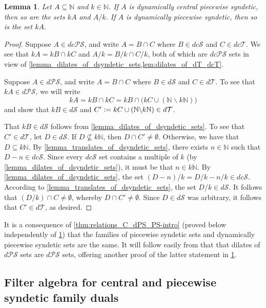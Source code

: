 \documentclass[letter,11pt]{article}
\theoremstyle{plain}
\newtheorem{lemma}[theorem]{Lemma}
\theoremstyle{definition}
\theoremstyle{plain}
\theoremstyle{plain}
\numberwithin{equation}{section}
\newcommand{\N}{\mathbb{N}}
\newcommand{\defeq}{\vcentcolon=}
\renewcommand{\setminus}{\backslash}
\newcommand{\dsyndetic}{d\mathcal{S}}
\newcommand{\dthick}{d\mathcal{T}}
\newcommand{\dcsyndetic}{dc\mathcal{S}}
\newcommand{\dcthick}{dc\mathcal{T}}
\newcommand{\dPS}{d\mathcal{PS}}
\newcommand{\dcPS}{dc\mathcal{PS}}
\begin{document}
\begin{lemma}
\label{lemma_dilates_of_dps_sets}
    Let $A \subseteq \N$ and $k \in \N$. If $A$ is dynamically central piecewise syndetic, then so are the sets $kA$ and $A/k$. If $A$ is dynamically piecewise syndetic, then so is the set $kA$.
\end{lemma}

\begin{proof}
    Suppose $A \in \dcPS$, and write $A = B \cap C$ where $B \in \dcsyndetic$ and $C \in \dcthick$. We see that $kA = kB \cap kC$ and $A/k = B/k \cap C/k$, both of which are $\dcPS$ sets in view of  \cref{lemma_dilates_of_dsyndetic_sets,lem:dilates_of_dT_dcT}.

    Suppose $A \in \dPS$, and write $A = B \cap C$ where $B \in \dsyndetic$ and $C \in \dthick$.  To see that $kA \in \dPS$, we will write
    \[kA = kB \cap kC = kB \cap \big( kC \cup ( \N \setminus k \N ) \big)\]
    and show that $kB \in \dsyndetic$ and $C' \defeq kC \cup ( \N \setminus k \N ) \in \dthick$.
    
    That $kB \in \dsyndetic$ follows from \cref{lemma_dilates_of_dsyndetic_sets}.  To see that $C' \in \dthick$, let $D \in \dsyndetic$.  If $D \not\subseteq k\N$, then $D \cap C' \neq \emptyset$.  Otherwise, we have that $D \subseteq k \N$.   By \cref{lemma_translates_of_dsyndetic_sets}, there exists $n \in \N$ such that $D - n \in \dcsyndetic$. Since every $\dcsyndetic$ set contains a multiple of $k$ (by \cref{lemma_dilates_of_dsyndetic_sets}), it must be that $n \in k \N$. By \cref{lemma_dilates_of_dsyndetic_sets}, the set $(D - n)/k = D/k - n/k \in \dcsyndetic$. According to \cref{lemma_translates_of_dsyndetic_sets}, the set $D/k \in \dsyndetic$. It follows that $(D/k) \cap C \neq \emptyset$, whereby $D \cap C' \neq \emptyset$.  Since $D \in \dsyndetic$ was arbitrary, it follows that $C' \in \dthick$, as desired.
\end{proof}

It is a consequence of \cref{thm:relations_C_dPS_PS-intro} (proved below independently of \cref{lemma_dilates_of_dps_sets}) that the families of piecewise syndetic sets and dynamically piecewise syndetic sets are the same.  It will follow easily from that that dilates of $\dPS$ sets are $\dPS$ sets, offering another proof of the latter statement in \cref{lemma_dilates_of_dps_sets}.

\subsection{Filter algebra for central and piecewise syndetic family duals}
\label{sec_filter_algebra_for_central_duals}
\end{document}
